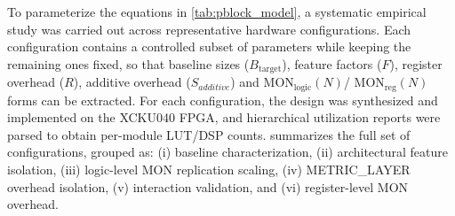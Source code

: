 To parameterize the equations in \cref{tab:pblock_model}, a systematic empirical study was carried out across representative hardware configurations. Each configuration contains a controlled subset of parameters while keeping the remaining ones fixed, so that baseline sizes ($B_{\text{target}}$), feature factors ($F$), register overhead ($R$), additive overhead ($S_{additive}$) and  $\text{MON}_{\text{logic}}(N)$/ $\text{MON}_{\text{reg}}(N)$ forms can be extracted. For each configuration, the design was synthesized and implemented on the XCKU040 \ac{FPGA}, and hierarchical utilization reports were parsed to obtain per-module \ac{LUT}/DSP counts.  summarizes the full set of configurations, grouped as: (i) baseline characterization, (ii) architectural feature isolation, (iii) logic-level MON replication scaling, (iv) METRIC\_LAYER overhead isolation, (v) interaction validation, and (vi) register-level MON overhead.

